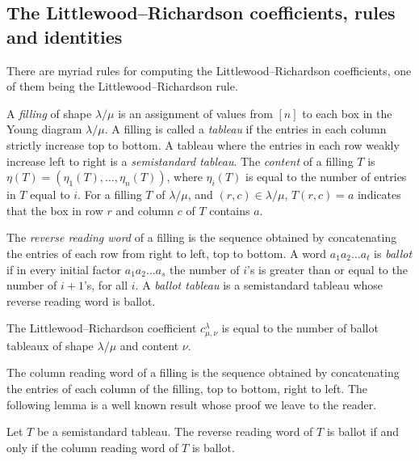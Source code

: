 \documentclass[ALCO,ThmDefs,Unicode,epreuves]{cedram}
\begin{document}
\subsection{The Littlewood--Richardson coefficients, rules and identities}\label{subsec:LRrule}

There are myriad rules for computing the Littlewood--Richardson coefficients, one of them being the Littlewood--Richardson rule.

A \emph{filling} of shape $\lambda / \mu$ is an assignment of values from $[n]$ to each box in the Young diagram $\lambda / \mu$. A filling is called a \emph{tableau} if the entries in each column strictly increase top to bottom. A tableau where the entries in each row weakly increase left to right is a \emph{semistandard tableau}. The \emph{content} of a filling $T$ is $\eta(T) = (\eta_1(T), \ldots, \eta_n(T))$, where $\eta_i(T)$ is equal to the number of entries in $T$ equal to $i$. For a filling $T$ of $\lambda / \mu$, and $(r,c) \in \lambda / \mu$, $T(r,c)=a$ indicates that the box in row $r$ and column $c$ of $T$ contains $a$.

The \emph{reverse reading word} of a filling is the sequence obtained by concatenating the entries of each row from right to left, top to bottom. A word $a_1 a_2 \ldots a_t$ is \emph{ballot} if in every initial factor $a_1 a_2 \ldots a_s$ the number of $i$'s is greater than or equal to the number of $i+1$'s, for all $i$. A \emph{ballot tableau} is a semistandard tableau whose reverse reading word is ballot.

\begin{theorem} 
\label{theorem:lrrule}
The Littlewood--Richardson coefficient $c_{\mu, \nu}^{\lambda}$ is equal to the number of ballot tableaux of shape $\lambda / \mu$ and content $\nu$.
\end{theorem}

The column reading word of a filling is the sequence obtained by concatenating the entries of each column of the filling, top to bottom, right to left. The following lemma is a well known result whose proof we leave to the reader.

\begin{lemma}[\cite{FG93}]
\label{lemma:readingwordequiv}
Let $T$ be a semistandard tableau. The reverse reading word of $T$ is ballot if and only if the column reading word of $T$ is ballot.
\end{lemma}
\end{document}
